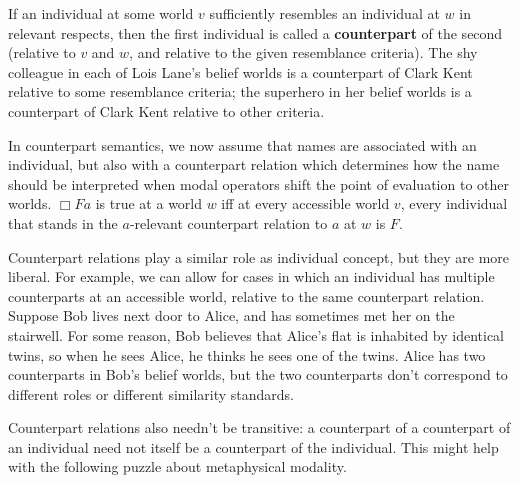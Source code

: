If an individual at some world $v$ sufficiently resembles an individual at $w$
in relevant respects, then the first individual is called a \textbf{counterpart}
of the second (relative to $v$ and $w$, and relative to the given resemblance
criteria). The shy colleague in each of Lois Lane's belief worlds is a
counterpart of Clark Kent relative to some resemblance criteria; the superhero
in her belief worlds is a counterpart of Clark Kent relative to other criteria.

In counterpart semantics, we now assume that names are associated with an
individual, but also with a counterpart relation which determines how the name
should be interpreted when modal operators shift the point of evaluation to
other worlds. $\Box Fa$ is true at a world $w$ iff at every accessible world
$v$, every individual that stands in the $a$-relevant counterpart relation to
$a$ at $w$ is $F$.

Counterpart relations play a similar role as individual concept, but they are
more liberal. For example, we can allow for cases in which an individual has
multiple counterparts at an accessible world, relative to the same counterpart
relation. Suppose Bob lives next door to Alice, and has sometimes met her on the
stairwell. For some reason, Bob believes that Alice's flat is inhabited by
identical twins, so when he sees Alice, he thinks he sees one of the
twins. Alice has two counterparts in Bob's belief worlds, but the two
counterparts don't correspond to different roles or different similarity
standards.

Counterpart relations also needn't be transitive: a counterpart of a counterpart
of an individual need not itself be a counterpart of the individual. This might
help with the following puzzle about metaphysical modality.


